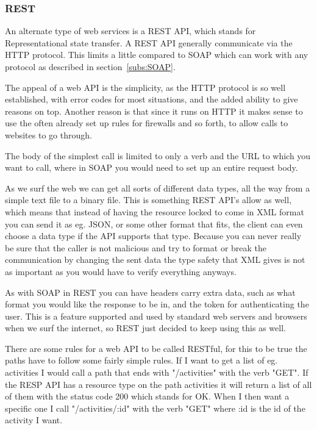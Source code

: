 \subsubsection{REST}
\label{subs:REST}
An alternate type of web services is a REST API, which stands for
Representational state transfer. A REST API generally communicate via the HTTP
protocol. This limits a little compared to SOAP which can work with any protocol
as described in section~\ref{subs:SOAP}. 

The appeal of a web API is the simplicity, as the HTTP protocol is so well
established, with error codes for most situations, and the added ability to give
reasons on top. Another reason is that since it runs on HTTP it makes sense to
use the often already set up rules for firewalls and so forth, to allow calls to
websites to go through. 

The body of the simplest call is limited to only a verb and the URL to which you
want to call, where in SOAP you would need to set up an entire request body. 

As we surf the web we can get all sorts of different data types, all the way
from a simple text file to a binary file. This is something REST API's allow as
well, which means that instead of having the resource locked to come in XML
format you can send it as eg. JSON, or some other format that
fits\cite{rest:basic}, the client can even choose a data type if the API
supports that type. Because you can never really be sure that the caller is not 
malicious and try to format or break the communication by changing the sent data
the type safety that XML gives is not as important as you would have to verify
everything anyways. 

As with SOAP in REST you can have headers carry extra data, such as what format you
would like the response to be in, and the token for authenticating the user.
This is a feature supported and used by standard web servers and browsers when
we surf the internet, so REST just decided to keep using this as well. 

There are some rules for a web API to be called RESTful\cite{rest:msdn}, for
this to be true the paths have to follow some fairly simple rules. If I want to
get a list of eg. activities I would call a path that ends with "/activities"
with the verb "GET". If the RESP API has a resource type on the path activities
it will return a list of all of them with the status code 200 which stands for
OK. When I then want a specific one I call "/activities/:id" with the verb "GET"
where :id is the id of the activity I want. 

